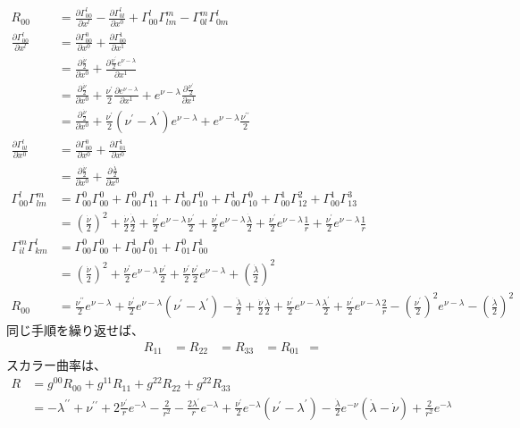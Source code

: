 \documentclass{jsarticle}
\newcommand{\pder}[2][]{\frac{\partial#1}{\partial#2}}
\newcommand{\pderx}[2][]{\pder[#1]{x^{#2}}}
\newcommand{\GaT}[3]{\Gamma^{#1}_{#2 #3}}
\newcommand{\pderGaTx}[4]{\pderx[\GaT{#1}{#2}{#3}]{#4}}
\newcommand{\Ricchiinside}[2]{\pder[\Gamma^l_{#1 #2}]{x^l} - \pder[\Gamma^l_{#1 l}]{x^{#2}} 
+ \GaT{l}{#1}{#2}\GaT{m}{l}{m} - \GaT{m}{#1}{l}\GaT{l}{#2}{m}}
\newcommand{\hnud}{\frac{\dot{\nu}}{2}}
\newcommand{\hlad}{\frac{\dot{\lambda}}{2}}
\newcommand{\hnup}{\frac{\nu^\prime}{2}}
\newcommand{\hlap}{\frac{\lambda^\prime}{2}}
\newcommand{\hnupp}{\frac{\nu^{\prime \prime}}{2}}
\newcommand{\hladd}{\frac{\ddot{\lambda}}{2}}
\newcommand{\nula}{\nu - \lambda}
\newcommand{\enula}{e^{\nula}}
\begin{document}
\begin{align}
    R_{00} &= \Ricchiinside{0}{0}\\
    \pderGaTx{l}{0}{0}{l} &= \pderGaTx{0}{0}{0}{0} + \pderGaTx{1}{0}{0}{1}\\
                          &= \pderx[\frac{\dot{\nu}}{2}]{0} + \pderx[\frac{\nu^\prime }{2}e^{\nu - \lambda}]{1} \\
                          &= \pderx[\frac{\dot{\nu}}{2}]{0} + \frac{\nu^\prime }{2}\pderx[e^{\nu - \lambda}]{1} + e^{\nu - \lambda}\pderx[\frac{\nu^\prime }{2}]{1}\\ 
                          &= \pderx[\frac{\dot{\nu}}{2}]{0} + \frac{\nu^\prime }{2}(\nu^\prime - \lambda^\prime)e^{\nu - \lambda}
                          + e^{\nu - \lambda}\frac{\nu^{\prime \prime}}{2}\\ 
    \pderGaTx{l}{0}{l}{0} &= \pderGaTx{0}{0}{0}{0} + \pderGaTx{1}{0}{1}{0}\\
                          &= \pderx[\frac{\dot{\nu}}{2}]{0} + \pderx[\frac{\dot{\lambda}}{2}]{0}\\
    \GaT{l}{0}{0} \GaT{m}{l}{m} &= \GaT{0}{0}{0} \GaT{0}{0}{0} + \GaT{0}{0}{0} \GaT{0}{1}{1} + \GaT{1}{0}{0} \GaT{0}{1}{0} + \GaT{1}{0}{0} \GaT{0}{1}{0} + \GaT{1}{0}{0} \GaT{2}{1}{2} + \GaT{1}{0}{0} \GaT{3}{1}{3}\\
                                &= (\hnud)^2 + \hnud \hlad + \hnup e^{\nu - \lambda} \hnup + \hnup e^{\nu - \lambda} \hlad + \hnup e^{\nu - \lambda} \frac{1}{r} +\hnup e^{\nu - \lambda} \frac{1}{r}\\
                                \GaT{m}{i}{l} \GaT{l}{k}{m} &= \GaT{0}{0}{0} \GaT{0}{0}{0} + \GaT{1}{0}{0} \GaT{0}{0}{1} + \GaT{0}{0}{1} \GaT{1}{0}{0}\\
                                                            &= (\hnud)^2 + \hnup e^{\nu - \lambda} \hnup + \hnup \hnup e^{\nu - \lambda} + (\hlad)^2\\
                                R_{00} &= \hnupp \enula  + \hnup \enula (\nu^\prime - \lambda^\prime) - \hladd + \hnud \hlad + \hnup \enula \hlap + \hnup \enula \frac{2}{r} - (\hnup)^2 \enula - (\hlad)^2
\end{align}
同じ手順を繰り返せば、
\begin{align}
    R_{11} &= 
    R_{22} &= 
    R_{33} &= 
    R_{01} &=
\end{align}
スカラー曲率は、
\begin{align}
    R &= g^{00} R_{00} + g^{11} R_{11}+ g^{22} R_{22}+ g^{22} R_{33}\\
      &= - \lambda^{\prime \prime} + \nu^{\prime \prime} + 2 \frac{\nu^\prime}{r} e^{-\lambda} - \frac{2}{r^2} - \frac{2\lambda^\prime}{r}e^{-\lambda} + \hnup e^{-\lambda} (\nu^\prime - \lambda^\prime) - \hlad e^{-\nu}(\dot{\lambda} - \dot{\nu}) + \frac{2}{r^2} e^{-\lambda}\\
\end{align}
\end{document}
